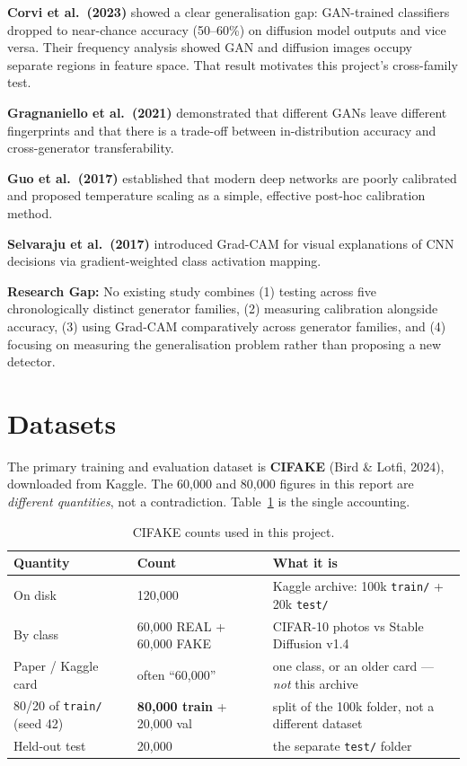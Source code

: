\documentclass[12pt,a4paper]{article}
\begin{document}
\textbf{Corvi et al.\ (2023)} showed a clear generalisation gap: GAN-trained classifiers dropped to near-chance accuracy (50--60\%) on diffusion model outputs and vice versa. Their frequency analysis showed GAN and diffusion images occupy separate regions in feature space. That result motivates this project's cross-family test.

\textbf{Gragnaniello et al.\ (2021)} demonstrated that different GANs leave different fingerprints and that there is a trade-off between in-distribution accuracy and cross-generator transferability.

\textbf{Guo et al.\ (2017)} established that modern deep networks are poorly calibrated and proposed temperature scaling as a simple, effective post-hoc calibration method.

\textbf{Selvaraju et al.\ (2017)} introduced Grad-CAM for visual explanations of CNN decisions via gradient-weighted class activation mapping.

\medskip
\noindent\textbf{Research Gap:} No existing study combines (1) testing across five chronologically distinct generator families, (2) measuring calibration alongside accuracy, (3) using Grad-CAM comparatively across generator families, and (4) focusing on measuring the generalisation problem rather than proposing a new detector.

\section{Datasets}

The primary training and evaluation dataset is \textbf{CIFAKE} (Bird \& Lotfi, 2024), downloaded from Kaggle. The 60{,}000 and 80{,}000 figures in this report are \emph{different quantities}, not a contradiction. Table~\ref{tab:accounting} is the single accounting.

\begin{table}[ht]
\centering
\caption{CIFAKE counts used in this project.}
\label{tab:accounting}
\small
\begin{tabular}{p{4.2cm}p{4.0cm}p{6.0cm}}
\toprule
\textbf{Quantity} & \textbf{Count} & \textbf{What it is} \\
\midrule
On disk & 120{,}000 & Kaggle archive: 100k \texttt{train/} + 20k \texttt{test/} \\
By class & 60{,}000 REAL + 60{,}000 FAKE & CIFAR-10 photos vs Stable Diffusion v1.4 \\
Paper / Kaggle card & often ``60{,}000'' & one class, or an older card --- \emph{not} this archive \\
80/20 of \texttt{train/} (seed 42) & \textbf{80{,}000 train} + 20{,}000 val & split of the 100k folder, not a different dataset \\
Held-out test & 20{,}000 & the separate \texttt{test/} folder \\
\bottomrule
\end{tabular}
\end{table}
\end{document}
